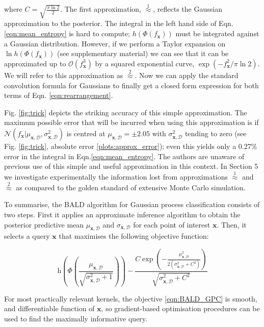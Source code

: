 \documentclass{article}
\newcommand{\x}{\bm{x}}
\newcommand{\data}{\mathcal{D}}
\newcommand{\ourmethod}{BALD } %
\begin{document}
where $C=\sqrt{\frac{\pi\ln2}{2}}$. The first approximation, {\scriptsize $\stackrel{1}{\approx}$}, reflects the Gaussian approximation to the posterior. The integral in the left hand side of Eqn. \eqref{eqn:mean_entropy} is hard to compute; $h(\Phi(f_{\x}))$ must be integrated against a Gaussian distribution. However, if we perform a Taylor expansion on $\ln h(\Phi(f_{\x}))$ (see supplementary material) we can see that it can be approximated up to $\mathcal{O}(f_{\x}^3)$ by a squared exponential curve, $\exp(-f_{\x}^2/\pi\ln2)$. We will refer to this approximation as {\scriptsize $\stackrel{2}{\approx}$}. Now we can apply the standard convolution formula for Gaussians to finally get a closed form expression for both terms of  Eqn. \eqref{eqn:rearrangement}.

Fig. \ref{fig:trick} depicts the striking accuracy of this simple approximation. The maximum possible error that will be incurred when using this approximation is if $\mathcal{N}(f_{\x}\vert \mu_{\x,\data},\sigma_{\x,\data}^2)$ is centred at $\mu_{\x,\data}=\pm 2.05$  with $\sigma_{\x,\data}^2$ tending to zero (see Fig. \ref{fig:trick}, absolute error \ref{plots:approx_error}); even this yields only a 0.27\% error in the integral in Eqn.\eqref{eqn:mean_entropy}. The authors are unaware of previous use of this simple and useful approximation in this context.  In Section 5 we investigate experimentally the information lost from approximations {\scriptsize $\stackrel{1}{\approx}$} and {\scriptsize $\stackrel{2}{\approx}$} as compared to the golden standard of extensive Monte Carlo simulation.

To summarise, the \ourmethod algorithm for Gaussian process classification consists of two steps. First it applies an approximate inference algorithm to obtain the posterior predictive mean $\mu_{\x,\data}$ and $\sigma_{\x,\data}$ for each point of interest $\x$. Then, it selects a query $\x$ that maximises the following objective function:

\begin{equation}
	\mathrm{h} \left( \Phi\left( \frac{\mu_{\x,\data}}{\sqrt{\sigma^2_{\x,\data} + 1}} \right)\right) - \frac{C \exp\left(-\frac{\mu_{\x,\data}^2}{2\left(\sigma_{\x,\data}^2 + C^2\right)}\right)}{\sqrt{\sigma_{\x,\data}^2 + C^2}} \label{eqn:BALD_GPC}
\end{equation}

For most practically relevant kernels, the objective \eqref{eqn:BALD_GPC} is smooth, and differentiable function of $\x$, so gradient-based optimisation procedures can be used to find the maximally informative query.
\end{document}
